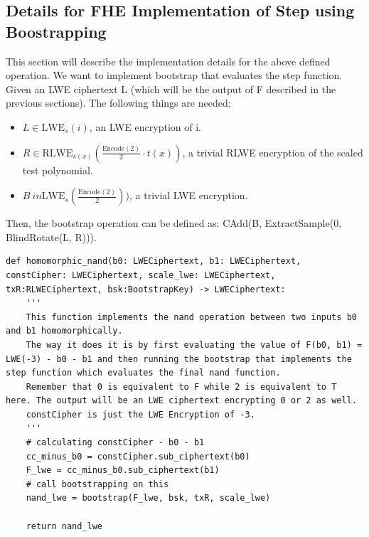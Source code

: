 \documentclass{report}
\begin{document}
\subsection{Details for FHE Implementation of Step using Boostrapping}
This section will describe the implementation details for the above defined operation. We want to implement bootstrap that evaluates the step function. Given an LWE ciphertext L (which will be the output of F described in the previous sections). The following things are needed:
\begin{itemize}
	\item $L \in \text{LWE}_s(i)$, an LWE encryption of i.
	\item $R \in \text{RLWE}_{s(x)}(\frac{\text{Encode}(2)}{2} \cdot t(x))$, a trivial RLWE encryption of the scaled test polynomial.
	\item $B \ in \text{LWE}_s(\frac{\text{Encode}(2)}{2}))$, a trivial LWE encryption.
\end{itemize}

Then, the bootstrap operation can be defined as: CAdd(B, ExtractSample(0, BlindRotate(L, R))).

\begin{verbatim}
def homomorphic_nand(b0: LWECiphertext, b1: LWECiphertext, constCipher: LWECiphertext, scale_lwe: LWECiphertext, txR:RLWECiphertext, bsk:BootstrapKey) -> LWECiphertext:
	'''
	This function implements the nand operation between two inputs b0 and b1 homomorphically.
	The way it does it is by first evaluating the value of F(b0, b1) = LWE(-3) - b0 - b1 and then running the bootstrap that implements the step function which evaluates the final nand function.
	Remember that 0 is equivalent to F while 2 is equivalent to T here. The output will be an LWE ciphertext encrypting 0 or 2 as well.
	constCipher is just the LWE Encryption of -3.
	'''
	# calculating constCipher - b0 - b1
	cc_minus_b0 = constCipher.sub_ciphertext(b0)
	F_lwe = cc_minus_b0.sub_ciphertext(b1)
	# call bootstrapping on this
	nand_lwe = bootstrap(F_lwe, bsk, txR, scale_lwe)
	
	return nand_lwe
\end{verbatim}
\end{document}
